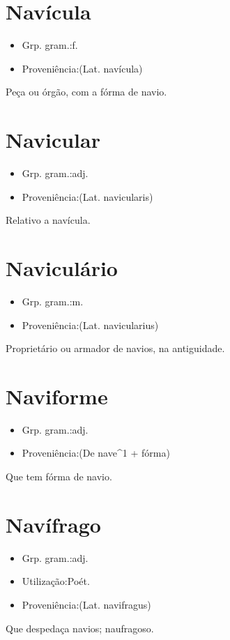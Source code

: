 \section{Navícula}
\begin{itemize}
\item {Grp. gram.:f.}
\end{itemize}
\begin{itemize}
\item {Proveniência:(Lat. \textunderscore navícula\textunderscore )}
\end{itemize}
Peça ou órgão, com a fórma de navio.
\section{Navicular}
\begin{itemize}
\item {Grp. gram.:adj.}
\end{itemize}
\begin{itemize}
\item {Proveniência:(Lat. \textunderscore navicularis\textunderscore )}
\end{itemize}
Relativo a navícula.
\section{Naviculário}
\begin{itemize}
\item {Grp. gram.:m.}
\end{itemize}
\begin{itemize}
\item {Proveniência:(Lat. \textunderscore navicularius\textunderscore )}
\end{itemize}
Proprietário ou armador de navios, na antiguidade.
\section{Naviforme}
\begin{itemize}
\item {Grp. gram.:adj.}
\end{itemize}
\begin{itemize}
\item {Proveniência:(De \textunderscore nave\textunderscore ^1 + \textunderscore fórma\textunderscore )}
\end{itemize}
Que tem fórma de navio.
\section{Navífrago}
\begin{itemize}
\item {Grp. gram.:adj.}
\end{itemize}
\begin{itemize}
\item {Utilização:Poét.}
\end{itemize}
\begin{itemize}
\item {Proveniência:(Lat. \textunderscore navifragus\textunderscore )}
\end{itemize}
Que despedaça navios; naufragoso.
